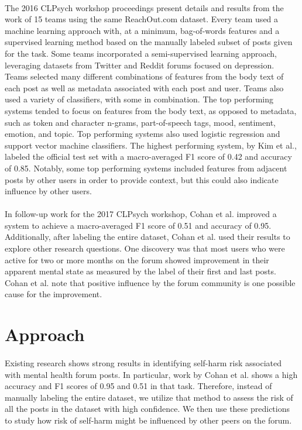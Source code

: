 \documentclass{article}
\begin{document}
\paragraph{}The 2016 CLPsych workshop proceedings present details and results from the work of 15 teams using the same ReachOut.com dataset. Every team used a machine learning approach with, at a minimum, bag-of-words features and a supervised learning method based on the manually labeled subset of posts given for the task. Some teams incorporated a semi-supervised learning approach, leveraging datasets from Twitter and Reddit forums focused on depression. Teams selected many different combinations of features from the body text of each post as well as metadata associated with each post and user. Teams also used a variety of classifiers, with some in combination\cite{milne}. The top performing systems tended to focus on features from the body text, as opposed to metadata, such as token and character n-grams, part-of-speech tags, mood, sentiment, emotion, and topic. Top performing systems also used logistic regression and support vector machine classifiers. The highest performing system, by Kim et al., labeled the official test set with a macro-averaged F1 score of 0.42 and accuracy of 0.85\cite{kim}. Notably, some top performing systems included features from adjacent posts by other users in order to provide context, but this could also indicate influence by other users.

\paragraph{}In follow-up work for the 2017 CLPsych workshop, Cohan et al. improved a system to achieve a macro-averaged F1 score of 0.51 and accuracy of 0.95. Additionally, after labeling the entire dataset, Cohan et al. used their results to explore other research questions. One discovery was that most users who were active for two or more months on the forum showed improvement in their apparent mental state as measured by the label of their first and last posts\cite{cohan2}. Cohan et al. note that positive influence by the forum community is one possible cause for the improvement.

\section{Approach}

\paragraph{}Existing research shows strong results in identifying self-harm risk associated with mental health forum posts\cite{milne}. In particular, work by Cohan et al. shows a high accuracy and F1 scores of 0.95 and 0.51 in that task\cite{cohan2}. Therefore, instead of manually labeling the entire dataset, we utilize that method to assess the risk of all the posts in the dataset with high confidence. We then use these predictions to study how risk of self-harm might be influenced by other peers on the forum.
\end{document}

